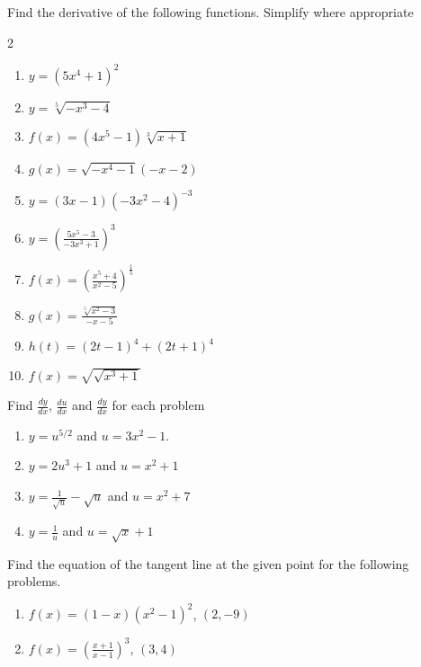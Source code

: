 \documentclass[12pt,letterpaper]{article}
\newenvironment{problem}[2][Problem]{\begin{trivlist}
\item[\hskip \labelsep {\bfseries #1}\hskip \labelsep {\bfseries #2.}]}{\end{trivlist}}
\newenvironment{sol}
    {\emph{Solution:}
    }
    {
    \qed
    }
\begin{document}



\begin{problem}{1}
Find the derivative of the following functions.  Simplify where appropriate
\begin{multicols}{2}
  \begin{enumerate}[label=\roman*)]
  \item $y=(5x^4+1)^2 $
  \item $ y=\sqrt[5]{-x^3-4}$
  \item $ f(x) = (4x^5-1)\sqrt[3]{x+1}$
  \item $g(x) = \sqrt{-x^4-1}(-x-2) $
  \item $ y=(3x-1)(-3x^2-4)^{-3}$
  \item $ y=\left(\frac{5x^5-3}{-3x^3+1}\right)^3$
  \item $ f(x)=\left(\frac{x^5+4}{x^2-5}\right)^{\frac{1}{5}}$
  \item $g(x) = \frac{\sqrt[5]{x^2-3}}{-x-5} $
  \item $h(t) = (2t-1)^4+(2t+1)^4 $
  \item $f(x) = \sqrt{\sqrt{x^3+1}}$
  \end{enumerate}
\end{multicols}
\end{problem}


\begin{problem}{2}
  Find $\displaystyle \frac{dy}{dx}$, $\displaystyle \frac{du}{dx}$ and $\displaystyle\frac{dy}{dx}$ for each problem
  \begin{enumerate}
  \item $y = u^{5/2} $ and $u = 3x^2-1$.
  \item $y = 2u^3+1 $ and $u = x^2+1$
  \item $ y = \frac{1}{\sqrt{u}}-\sqrt{u}$ and $u = x^2+7$
    \item $y = \frac{1}{u}$ and $u = \sqrt{x} +1$
  \end{enumerate}
\end{problem}

\begin{problem}{3}
  Find the equation of the tangent line at the given point for the following problems.
  \begin{enumerate}
  \item $f(x) = (1-x)(x^2-1)^2$, $(2,-9)$
  \item $f(x) = \left(\frac{x+1}{x-1} \right)^3$, $(3,4)$
    \end{enumerate}
\end{problem}

  



\end{document}
